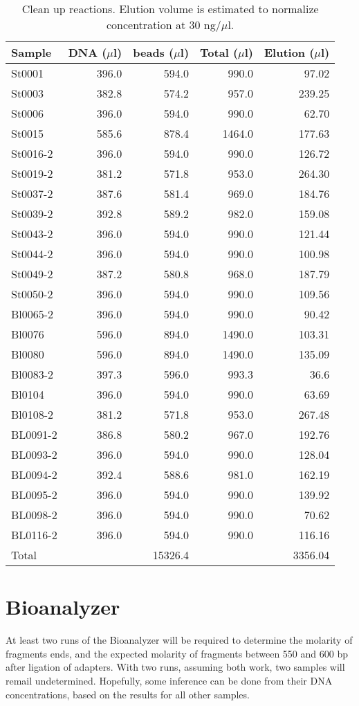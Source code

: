 \documentclass[a4paper,12pt,twosided]{article}
\begin{document}
\begin{table}
\begin{center}
\caption{Clean up reactions. Elution volume is estimated to normalize concentration at 30 ng/$\mu$l.}\label{tau:cleanup}
\vspace*{0.2cm}
\begin{tabular}{lrrrr}
\toprule
Sample&DNA ($\mu$l)&beads ($\mu$l)&Total ($\mu$l)&Elution ($\mu$l)\\
\midrule
St0001&396.0&594.0&990.0&97.02\\
St0003&382.8&574.2&957.0&239.25\\
St0006&396.0&594.0&990.0&62.70\\
St0015&585.6&878.4&1464.0&177.63\\
St0016-2&396.0&594.0&990.0&126.72\\
St0019-2&381.2&571.8&953.0&264.30\\
St0037-2&387.6&581.4&969.0&184.76\\
St0039-2&392.8&589.2&982.0&159.08\\
St0043-2&396.0&594.0&990.0&121.44\\
St0044-2&396.0&594.0&990.0&100.98\\
St0049-2&387.2&580.8&968.0&187.79\\
St0050-2&396.0&594.0&990.0&109.56\\
Bl0065-2&396.0&594.0&990.0&90.42\\
Bl0076&596.0&894.0&1490.0&103.31\\
Bl0080&596.0&894.0&1490.0&135.09\\
Bl0083-2&397.3&596.0&993.3&36.6\\
Bl0104&396.0&594.0&990.0&63.69\\
Bl0108-2&381.2&571.8&953.0&267.48\\
BL0091-2&386.8&580.2&967.0&192.76\\
BL0093-2&396.0&594.0&990.0&128.04\\
BL0094-2&392.4&588.6&981.0&162.19\\
BL0095-2&396.0&594.0&990.0&139.92\\
BL0098-2&396.0&594.0&990.0&70.62\\
BL0116-2&396.0&594.0&990.0&116.16\\
\midrule
Total&&15326.4&&3356.04\\
\bottomrule
\end{tabular}
\end{center}
\end{table}

\section{Bioanalyzer}
At least two runs of the Bioanalyzer will be required to determine the molarity of fragments ends, and the expected molarity of fragments between 550 and 600 bp after ligation of adapters. With two runs, assuming both work, two samples will remail undetermined. Hopefully, some inference can be done from their DNA concentrations, based on the results for all other samples.
\end{document}
